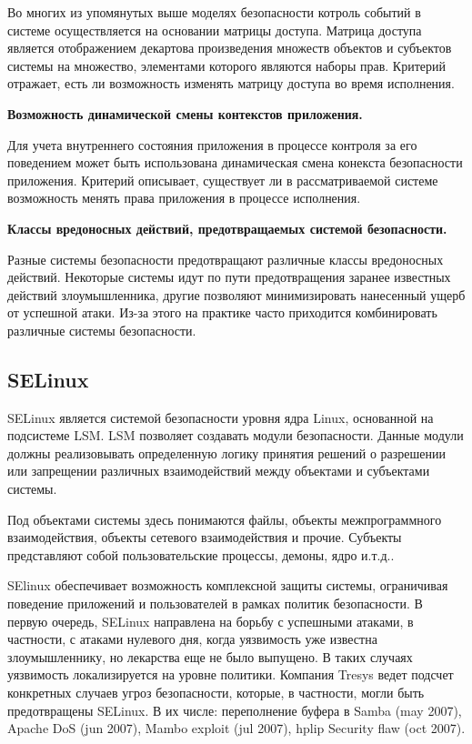 	Во многих из упомянутых выше моделях безопасности 
	котроль событий в системе осуществляется на основании 
	матрицы доступа. Матрица доступа является отображением 
	декартова произведения множеств объектов и субъектов 
	системы на множество, элементами которого являются 
	наборы прав.
	Критерий отражает, есть ли возможность изменять
	матрицу доступа во время исполнения. 

\bigskip 
{\bfseries Возможность динамической смены контекстов
	приложения.}
	
	Для учета внутреннего состояния приложения в 
	процессе контроля за его поведением может быть
	использована динамическая смена конекста безопасности 
	 приложения. 
	Критерий описывает, существует ли в рассматриваемой 
	системе возможность менять права приложения в процессе
	исполнения. 

\bigskip
{\bfseries Классы вредоносных действий, предотвращаемых 
	системой безопасности.}
	
	Разные системы безопасности предотвращают различные 
	классы вредоносных действий. Некоторые системы 
	идут по пути предотвращения заранее известных 
	действий злоумышленника, другие позволяют минимизировать 
	нанесенный ущерб от успешной атаки. Из-за этого на практике 
	часто приходится комбинировать различные системы безопасности.    

\bigskip
\subsection{SELinux} 
SELinux является системой безопасности 
уровня ядра Linux, основанной на 
подсистеме LSM. LSM позволяет 
создавать модули безопасности. Данные модули 
должны реализовывать 
определенную логику принятия решений о 
разрешении или запрещении различных 
взаимодействий между объектами и субъектами 
системы. 

Под объектами системы здесь 
понимаются файлы, объекты межпрограммного 
взаимодействия, объекты сетевого взаимодействия 
и прочие. Субъекты представляют собой 
пользовательские процессы, демоны, ядро и.т.д..

SElinux обеспечивает возможность 
комплексной защиты системы, ограничивая поведение 
приложений и пользователей в рамках политик 
безопасности. В первую очередь, SELinux 
направлена на борьбу с успешными атаками, 
в частности, с атаками нулевого дня, когда 
уязвимость уже известна злоумышленнику, 
но лекарства еще не было выпущено. В таких 
случаях уязвимость локализируется на уровне 
политики. Компания Tresys ведет подсчет 
конкретных случаев угроз безопасности, которые, 
в частности, могли быть предотвращены SELinux. 
В их числе: переполнение буфера в Samba (may 
2007), Apache DoS (jun 2007), Mambo exploit (jul 
2007), hplip Security flaw (oct 2007). 

